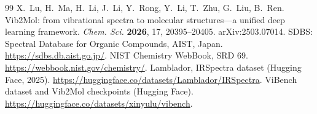 \documentclass[UTF8,a4paper,11pt]{ctexart}
\begin{document}
\begin{thebibliography}{99}\footnotesize
{} X.~Lu, H.~Ma, H.~Li, J.~Li, Y.~Rong, Y.~Li, T.~Zhu, G.~Liu, B.~Ren. Vib2Mol: from vibrational spectra to molecular structures—a unified deep learning framework. \emph{Chem. Sci.} \textbf{2026}, 17, 20395--20405. arXiv:2503.07014.
 SDBS: Spectral Database for Organic Compounds, AIST, Japan. \url{https://sdbs.db.aist.go.jp/}.
 NIST Chemistry WebBook, SRD 69. \url{https://webbook.nist.gov/chemistry/}.
 Lamblador, IRSpectra dataset (Hugging Face, 2025). \url{https://huggingface.co/datasets/Lamblador/IRSpectra}.
 ViBench dataset and Vib2Mol checkpoints (Hugging Face). \url{https://huggingface.co/datasets/xinyulu/vibench}.
\end{thebibliography}
\end{document}
